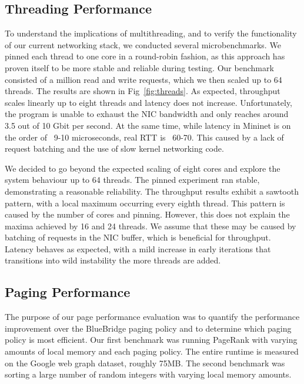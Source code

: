 \subsection{Threading Performance}
To understand the implications of multithreading, and to verify the functionality of our current networking stack, we conducted several microbenchmarks. We pinned each thread to one core in a round-robin fashion, as this approach has proven itself to be more stable and reliable during testing. Our benchmark consisted of a million read and write requests, which we then scaled up to 64 threads. The results are shown in Fig~\ref{fig:threads}.
As expected, throughput scales linearly up to eight threads and latency does not increase. Unfortunately, the program is unable to exhaust the NIC bandwidth and only reaches around 3.5 out of 10 Gbit per second. At the same time, while latency in Mininet is on the order of ~9-10 microseconds, real RTT is ~60-70. This caused by a lack of request batching and the use of slow kernel networking code.

We decided to go beyond the expected scaling of eight cores and explore the system behaviour up to 64 threads. The pinned experiment ran stable, demonstrating a reasonable reliability. The throughput results exhibit a sawtooth pattern, with a local maximum occurring  every eighth thread. This pattern is caused by the number of cores and pinning. However, this does not explain the maxima achieved by 16 and 24 threads. We assume that these may be caused by batching of requests in the NIC buffer, which is beneficial for throughput.
Latency behaves as expected, with a mild increase in early iterations that transitions into wild instability the more threads are added.

\subsection{Paging Performance}
The purpose of our page performance evaluation was to quantify the performance improvement over the BlueBridge paging policy and to determine which paging policy is most efficient. Our first benchmark was running PageRank with varying amounts of local memory and each paging policy. The entire runtime is measured on the Google web graph dataset, roughly 75MB. The second benchmark was sorting a large number of random integers with varying local memory amounts.


